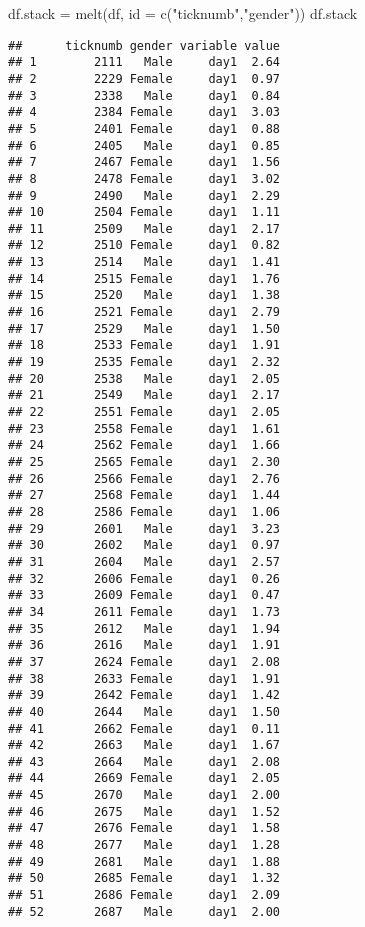 \documentclass[
]{article}
\newenvironment{Shaded}{\begin{snugshade}}{\end{snugshade}}
\newcommand{\AttributeTok}[1]{\textcolor[rgb]{0.77,0.63,0.00}{#1}}
\newcommand{\FunctionTok}[1]{\textcolor[rgb]{0.00,0.00,0.00}{#1}}
\newcommand{\NormalTok}[1]{#1}
\newcommand{\OtherTok}[1]{\textcolor[rgb]{0.56,0.35,0.01}{#1}}
\newcommand{\StringTok}[1]{\textcolor[rgb]{0.31,0.60,0.02}{#1}}
\begin{document}
\begin{Shaded}
\begin{Highlighting}[]
\NormalTok{df.stack }\OtherTok{=} \FunctionTok{melt}\NormalTok{(df, }\AttributeTok{id =} \FunctionTok{c}\NormalTok{(}\StringTok{"ticknumb"}\NormalTok{,}\StringTok{"gender"}\NormalTok{))}
\NormalTok{df.stack}
\end{Highlighting}
\end{Shaded}

\begin{verbatim}
##      ticknumb gender variable value
## 1        2111   Male     day1  2.64
## 2        2229 Female     day1  0.97
## 3        2338   Male     day1  0.84
## 4        2384 Female     day1  3.03
## 5        2401 Female     day1  0.88
## 6        2405   Male     day1  0.85
## 7        2467 Female     day1  1.56
## 8        2478 Female     day1  3.02
## 9        2490   Male     day1  2.29
## 10       2504 Female     day1  1.11
## 11       2509   Male     day1  2.17
## 12       2510 Female     day1  0.82
## 13       2514   Male     day1  1.41
## 14       2515 Female     day1  1.76
## 15       2520   Male     day1  1.38
## 16       2521 Female     day1  2.79
## 17       2529   Male     day1  1.50
## 18       2533 Female     day1  1.91
## 19       2535 Female     day1  2.32
## 20       2538   Male     day1  2.05
## 21       2549   Male     day1  2.17
## 22       2551 Female     day1  2.05
## 23       2558 Female     day1  1.61
## 24       2562 Female     day1  1.66
## 25       2565 Female     day1  2.30
## 26       2566 Female     day1  2.76
## 27       2568 Female     day1  1.44
## 28       2586 Female     day1  1.06
## 29       2601   Male     day1  3.23
## 30       2602   Male     day1  0.97
## 31       2604   Male     day1  2.57
## 32       2606 Female     day1  0.26
## 33       2609 Female     day1  0.47
## 34       2611 Female     day1  1.73
## 35       2612   Male     day1  1.94
## 36       2616   Male     day1  1.91
## 37       2624 Female     day1  2.08
## 38       2633 Female     day1  1.91
## 39       2642 Female     day1  1.42
## 40       2644   Male     day1  1.50
## 41       2662 Female     day1  0.11
## 42       2663   Male     day1  1.67
## 43       2664   Male     day1  2.08
## 44       2669 Female     day1  2.05
## 45       2670   Male     day1  2.00
## 46       2675   Male     day1  1.52
## 47       2676 Female     day1  1.58
## 48       2677   Male     day1  1.28
## 49       2681   Male     day1  1.88
## 50       2685 Female     day1  1.32
## 51       2686 Female     day1  2.09
## 52       2687   Male     day1  2.00

\end{verbatim}
\end{document}
